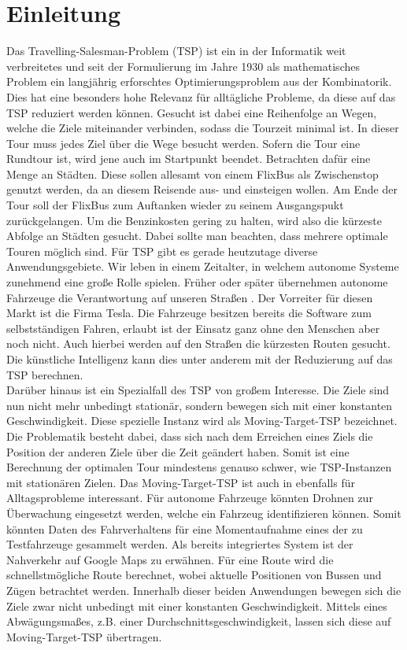 \documentclass[german,version-2019-11]{uzl-thesis}
\begin{document}
\chapter{Einleitung}

Das Travelling-Salesman-Problem (TSP) ist ein in der Informatik weit verbreitetes und seit der Formulierung im Jahre 1930 als mathematisches Problem ein langjährig erforschtes Optimierungsproblem aus der Kombinatorik. Dies hat eine besonders hohe Relevanz für alltägliche Probleme, da diese auf das TSP reduziert werden können. Gesucht ist dabei eine Reihenfolge an Wegen, welche die Ziele miteinander verbinden, sodass die Tourzeit minimal ist. In dieser Tour muss jedes Ziel über die Wege besucht werden. Sofern die Tour eine Rundtour ist, wird jene auch im Startpunkt beendet. Betrachten dafür eine Menge an Städten. Diese sollen allesamt von einem FlixBus als Zwischenstop genutzt werden, da an diesem Reisende aus- und einsteigen wollen. Am Ende der Tour soll der FlixBus zum Auftanken wieder zu seinem Ausgangspukt zurückgelangen. Um die Benzinkosten gering zu halten, wird also die kürzeste Abfolge an Städten gesucht. Dabei sollte man beachten, dass mehrere optimale Touren möglich sind. Für TSP gibt es gerade heutzutage diverse Anwendungsgebiete. Wir leben in einem Zeitalter, in welchem autonome Systeme zunehmend eine große Rolle spielen. Früher oder später übernehmen autonome Fahrzeuge die Verantwortung auf unseren Straßen \cite{minx2015autonomes}. Der Vorreiter für diesen Markt ist die Firma Tesla. Die Fahrzeuge besitzen bereits die Software zum selbstständigen Fahren, erlaubt ist der Einsatz ganz ohne den Menschen aber noch nicht. Auch hierbei werden auf den Straßen die kürzesten Routen gesucht. Die künstliche Intelligenz kann dies unter anderem mit der Reduzierung auf das TSP berechnen. \\
Darüber hinaus ist ein Spezialfall des TSP von großem Interesse. Die Ziele sind nun nicht mehr unbedingt stationär, sondern bewegen sich mit einer konstanten Geschwindigkeit. Diese spezielle Instanz wird als Moving-Target-TSP bezeichnet. Die Problematik besteht dabei, dass sich nach dem Erreichen eines Ziels die Position der anderen Ziele über die Zeit geändert haben. Somit ist eine Berechnung der optimalen Tour mindestens genauso schwer, wie TSP-Instanzen mit stationären Zielen. Das Moving-Target-TSP ist auch in ebenfalls für Alltagsprobleme interessant. Für autonome Fahrzeuge könnten Drohnen zur Überwachung eingesetzt werden, welche ein Fahrzeug identifizieren können. Somit könnten Daten des Fahrverhaltens für eine Momentaufnahme eines der zu Testfahrzeuge gesammelt werden. Als bereits integriertes System ist der Nahverkehr auf Google Maps zu erwähnen. Für eine Route wird die schnellstmögliche Route berechnet, wobei aktuelle Positionen von Bussen und Zügen betrachtet werden. Innerhalb dieser beiden Anwendungen bewegen sich die Ziele zwar nicht unbedingt mit einer konstanten Geschwindigkeit. Mittels eines Abwägungsmaßes, z.B. einer Durchschnittsgeschwindigkeit, lassen sich diese auf Moving-Target-TSP übertragen. \\
\end{document}
